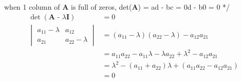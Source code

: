 \documentclass[12pt,border=4pt,multi]{article} %
\begin{document}
when 1 column of \textbf{A} is full of zeros, det(\textbf{A}) = ad - bc = 0d - b0 = 0 */
\begin{align*}
\det(\textbf{A - $\lambda$I}) &= 0\\
\begin{vmatrix}
a_{11} - \lambda & a_{12}\\
a_{21} & a_{22} - \lambda
\end{vmatrix} 
&= (a_{11} - \lambda)(a_{22} - \lambda) - a_{12} a_{21}\\
&= a_{11} a_{22} - a_{11} \lambda - \lambda a_{22} + \lambda^2 - a_{12} a_{21}\\
&= \lambda^2 - (a_{11} + a_{22})\lambda + (a_{11} a_{22} - a_{12} a_{21})\\ 
&= 0\\
\end{align*}
\end{document}
